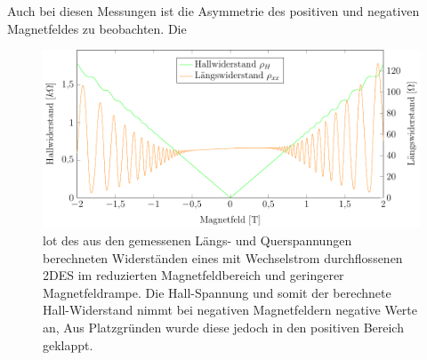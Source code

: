 Auch bei diesen Messungen ist die Asymmetrie des positiven und negativen Magnetfeldes zu beobachten. Die


\begin{figure}[h]
	\centering
	\includegraphics{graphs/ac/pm2T_range.pdf}
	\caption[Höher aufgelöste Gleichstrommessung in Magnetfeldteilbereich]{
		lot des aus den gemessenen Längs- und Querspannungen berechneten Widerständen eines mit Wechselstrom durchflossenen 2DES im reduzierten Magnetfeldbereich und geringerer Magnetfeldrampe. Die Hall-Spannung und somit der berechnete Hall-Widerstand nimmt bei negativen Magnetfeldern negative Werte an, Aus Platzgründen wurde diese jedoch in den positiven Bereich geklappt.
	}
	\label{fig:2T_range_ac}
\end{figure}


